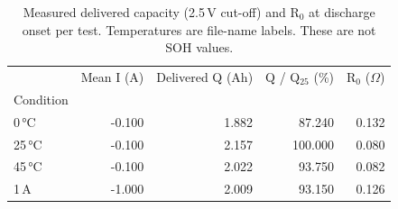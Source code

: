 \begin{table}[htbp]\centering\footnotesize
\begin{tabular}{lrrrr}
\toprule
 & Mean I (A) & Delivered Q (Ah) & Q / Q$_{25}$ (\%) & R$_0$ ($\Omega$) \\
Condition &  &  &  &  \\
\midrule
0\,°C & -0.100 & 1.882 & 87.240 & 0.132 \\
25\,°C & -0.100 & 2.157 & 100.000 & 0.080 \\
45\,°C & -0.100 & 2.022 & 93.750 & 0.082 \\
1\,A & -1.000 & 2.009 & 93.150 & 0.126 \\
\bottomrule
\end{tabular}
\caption{Measured delivered capacity (2.5\,V cut-off) and R$_0$ at discharge onset per test. Temperatures are file-name labels. These are not SOH values.}\label{tab:capacity}
\end{table}

